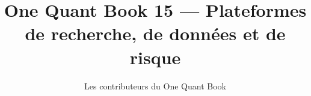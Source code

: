 \documentclass[11pt,a4paper,twoside,openany]{book}
\title{One Quant Book 15 --- Plateformes de recherche, de données et de risque}
\author{Les contributeurs du One Quant Book}
\date{\bookdate}
\begin{document}
\frontmatter



\tableofcontents

\mainmatter


\appendix
\part{\omsolutionspart}


\backmatter
\printindex
\end{document}
